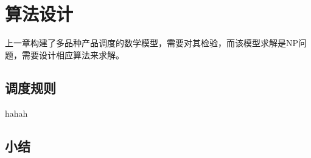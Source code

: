 \chapter{算法设计}
上一章构建了多品种产品调度的数学模型，需要对其检验，而该模型求解是NP问题，需要设计相应算法来求解。
\section{调度规则}

hahah


\section{小结}